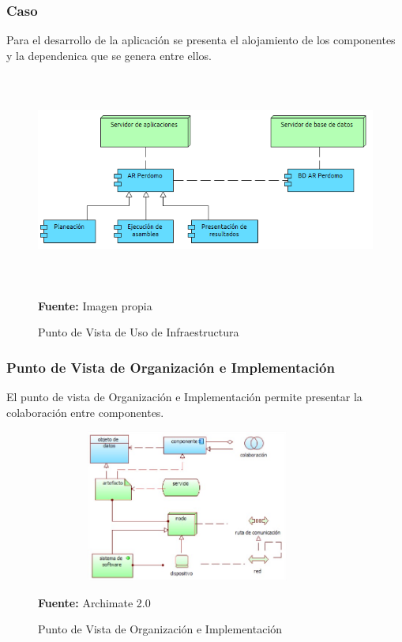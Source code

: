 \subsubsection{Caso}

Para el desarrollo de la aplicación se presenta el alojamiento de los componentes y la dependenica que se genera entre ellos.

\begin{figure}[th!]
	\centering
	\includegraphics[width=12cm,height=7cm]{arquitectura/tecnologia/imgs/uso}
	\caption{Punto de Vista de Uso de Infraestructura}{\scriptsize \textbf{Fuente:} Imagen propia}
\end{figure}
\newpage

\subsubsection{Punto de Vista de Organización e Implementación}

El punto de vista de Organización e Implementación permite presentar la colaboración entre componentes.


\begin{figure}[th!]
	\centering
	\includegraphics[width=10cm,height=5cm]{arquitectura/tecnologia/imgs/organizacion-e}
	\caption{Punto de Vista de Organización e Implementación}{\scriptsize \textbf{Fuente:} Archimate 2.0 \cite{WEB7}}
\end{figure}

